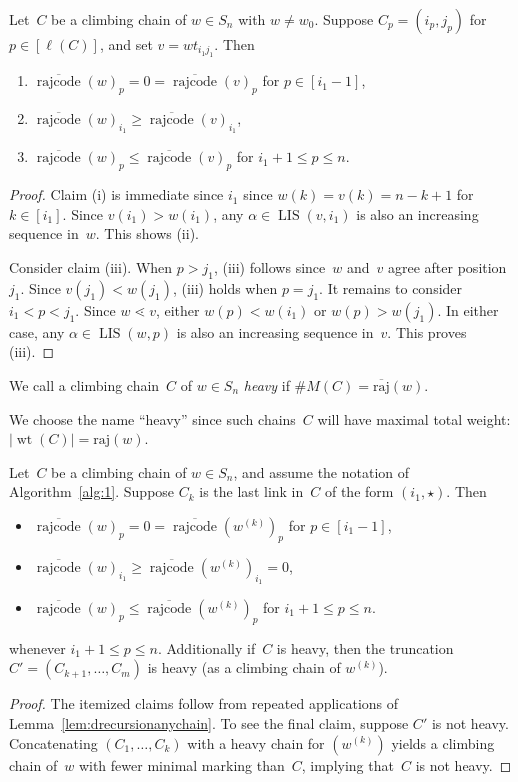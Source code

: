 \documentclass[ALCO]{cedram}
\newcommand{\absrajcode}[1]{\mathrm{raj}(#1)}
\newcommand{\absoverrajcode}[1]{\overline{\mathrm{raj}}(#1)}
\DeclareMathOperator{\LIS}{\mathrm{LIS}}
\DeclareMathOperator{\wt}{\mathrm{wt}}
\DeclareMathOperator{\rr}{\mathrm{rajcode}}
\newcommand{\orr}{\overline{\rr}}
\begin{document}
\begin{lemma}
	\label{lem:drecursionanychain}
	Let~$C$ be a climbing chain of $w\in S_n$ with $w\neq w_0$. Suppose $C_p=(i_p,j_p)$ for $p\in [\ell(C)]$, and set $v=wt_{i_1j_1}$. Then 
	\begin{enumerate}[label=\textup{(\roman*)}]
		\item $\orr(w)_p=0=\orr(v)_p$ for $p\in [i_1-1]$,
		\item $\orr(w)_{i_1}\geq \orr(v)_{i_1}$,
		\item $\orr(w)_p\leq \orr(v)_p$ for $i_1+1\leq p \leq n$.
	\end{enumerate}
\end{lemma}
\begin{proof}
	Claim (i) is immediate since $i_1$ since $w(k)=v(k)=n-k+1$ for $k\in[i_1]$. Since $v(i_1)>w(i_1)$, any $\alpha\in \LIS(v,i_1)$ is also an increasing sequence in~$w$. This shows (ii). 
	
	Consider claim (iii). When $p>j_1$, (iii) follows since~$w$ and~$v$ agree after position $j_1$. Since $v(j_1)<w(j_1)$, (iii) holds when $p=j_1$. It remains to consider $i_1<p<j_1$. Since $w\lessdot v$, either $w(p)<w(i_1)$ or $w(p)>w(j_1)$. In either case, any $\alpha\in \LIS(w,p)$ is also an increasing sequence in~$v$. This proves (iii).
\end{proof}

\begin{definition}
	We call a climbing chain~$C$ of $w\in S_n$ \emph{heavy} if $\#M(C) = \absoverrajcode{w}$.
\end{definition}
We choose the name ``heavy'' since such chains~$C$ will have maximal total weight: $|\wt(C)| = \absrajcode{w}$.

\begin{lemma}
	\label{lem:heavytruncation}
	Let~$C$ be a climbing chain of $w\in S_n$, and assume the notation of Algorithm~\ref{alg:1}.
	Suppose $C_k$ is the last link in~$C$ of the form $(i_1,\star)$. Then 
	\begin{itemize}
		\item $\orr(w)_p=0=\orr(w^{(k)})_p$ for $p\in [i_1-1]$,
		\item $\orr(w)_{i_1}\geq \orr(w^{(k)})_{i_1}=0$,
		\item $\orr(w)_p\leq \orr(w^{(k)})_p$ for $i_1+1\leq p \leq n$.
	\end{itemize}
	whenever $i_1+1\leq p\leq n$. Additionally if~$C$ is heavy, then the truncation $C'=(C_{k+1},\ldots,C_m)$ is heavy (as a climbing chain of $w^{(k)}$).
\end{lemma}
\begin{proof}
	The itemized claims follow from repeated applications of Lemma~\ref{lem:drecursionanychain}. To see the final claim, suppose $C'$ is not heavy. Concatenating $(C_1,\ldots,C_{k})$ with a heavy chain for $(w^{(k)})$ yields a climbing chain of~$w$ with fewer minimal marking than~$C$, implying that~$C$ is not heavy.
\end{proof}
\end{document}
